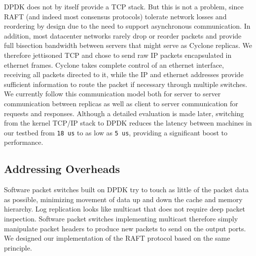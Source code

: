 \documentclass[letterpaper,twocolumn,10pt]{article}
\begin{document}
DPDK does not by itself provide a TCP stack. But this is not a problem, since
RAFT (and indeed most consensus protocols) tolerate network losses and
reordering by design due to the need to support asynchronous communication. In
addition, most datacenter networks rarely drop or reorder packets and provide
full bisection bandwidth between servers that might serve as Cyclone replicas. We
therefore jettisoned TCP and chose to send raw IP packets encapsulated in
ethernet frames. Cyclone takes complete control of an ethernet interface,
receiving all packets directed to it, while the IP and ethernet addresses
provide sufficient information to route the packet if necessary through multiple
switches. We currently follow this communication model both for server to server
communication between replicas as well as client to server communication for
requests and responses. Although a detailed evaluation is made later, switching
from the kernel TCP/IP stack to DPDK reduces the latency between machines in our
testbed from {\tt 18 us} to as low as {\tt 5 us}, providing a significant boost
to performance.

\subsection{Addressing Overheads}
\label{sec:dm}
Software packet switches built on DPDK try to touch as little of the packet data
as possible, minimizing movement of data up and down the cache and memory
hierarchy. Log replication looks like multicast that does not require deep
packet inspection. Software packet switches implementing multicast therefore
simply manipulate packet headers to produce new packets to send on the output
ports. We designed our implementation of the RAFT protocol based on the same
principle.
\end{document}
